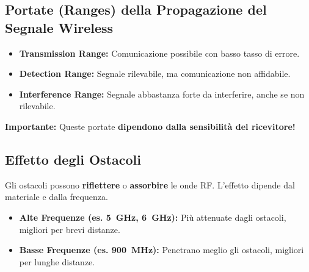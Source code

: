 \subsection{Portate (Ranges) della Propagazione del Segnale Wireless}
\begin{itemize}
    \item \textbf{Transmission Range:} Comunicazione possibile con basso tasso di errore.
    \item \textbf{Detection Range:} Segnale rilevabile, ma comunicazione non affidabile.
    \item \textbf{Interference Range:} Segnale abbastanza forte da interferire, anche se non rilevabile.
\end{itemize}
\textbf{Importante:} Queste portate \textbf{dipendono dalla sensibilità del ricevitore!}
\begin{center}
\end{center}

\subsection{Effetto degli Ostacoli}
Gli ostacoli possono \textbf{riflettere} o \textbf{assorbire} le onde RF. L'effetto dipende dal materiale e dalla frequenza.
\begin{itemize}
    \item \textbf{Alte Frequenze (es. \SI{5}{\giga\hertz}, \SI{6}{\giga\hertz}):} Più attenuate dagli ostacoli, migliori per brevi distanze.
    \item \textbf{Basse Frequenze (es. \SI{900}{\mega\hertz}):} Penetrano meglio gli ostacoli, migliori per lunghe distanze.
\end{itemize}

